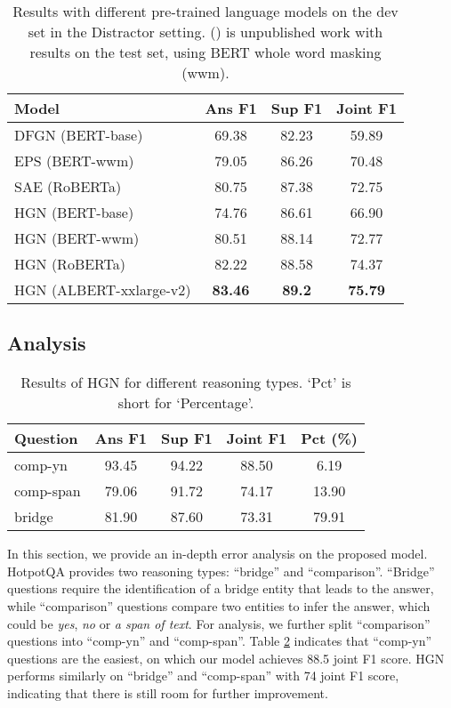 \documentclass[11pt,a4paper]{article}
\begin{document}
\begin{table}[t!]
\small
\centering
\begin{adjustbox}{scale=0.95,center}
\begin{tabular}{lccc}
\toprule
Model & Ans F1 & Sup F1  & Joint F1 \\ \midrule
DFGN (BERT-base) & 69.38 & 82.23 & 59.89 \\ 
EPS (BERT-wwm) & 79.05 & 86.26 & 70.48 \\
SAE (RoBERTa) & 80.75 & 87.38 & 72.75 \\
\midrule
HGN (BERT-base) & 74.76 & 86.61 & 66.90 \\
HGN (BERT-wwm) & 80.51 & 88.14 & 72.77 \\
HGN (RoBERTa) &  82.22 & 88.58 & 74.37 \\ 
HGN (ALBERT-xxlarge-v2) & \textbf{83.46} & \textbf{89.2} & \textbf{75.79} \\
\bottomrule
\end{tabular}
\end{adjustbox}
\caption{\label{table:HGN-LM}Results with different pre-trained language models on the dev set in the Distractor setting. () is unpublished work with results on the test set, using BERT whole word masking (wwm).}
\end{table}
 
\subsection{Analysis}

\begin{table}[t!]
\centering
\begin{adjustbox}{scale=0.95,center}
\begin{tabular}{lcccc}
\toprule
Question & Ans F1 & Sup F1 & Joint F1 & Pct (\%)\\ \midrule
comp-yn & 93.45 & 94.22 & 88.50 & 6.19 \\
comp-span & 79.06 & 91.72 & 74.17 & 13.90 \\
bridge & 81.90 & 87.60 & 73.31 & 79.91\\ \bottomrule
\end{tabular}
\end{adjustbox}
\caption{\label{table:res_reasoning} Results of HGN for different reasoning types. `Pct' is short for `Percentage'.}
\end{table} 
In this section, we provide an in-depth error analysis on the proposed model. HotpotQA provides two reasoning types: ``bridge'' and ``comparison''. ``Bridge'' questions require the identification of a bridge entity that leads to the answer, while ``comparison'' questions compare two entities to infer the answer, which could be \emph{yes}, \emph{no} or \emph{a span of text}. For analysis, we further split ``comparison'' questions into ``comp-yn'' and ``comp-span''. Table \ref{table:res_reasoning} indicates that ``comp-yn'' questions are the easiest, on which our model achieves 88.5 joint F1 score. HGN performs similarly on ``bridge'' and ``comp-span'' with 74 joint F1 score, indicating that there is still room for further improvement. 
\end{document}
